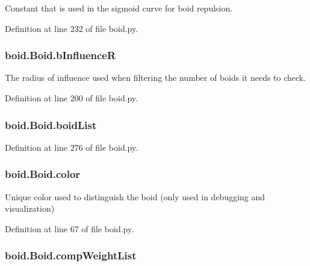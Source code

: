 Constant that is used in the sigmoid curve for boid repulsion. 



Definition at line 232 of file boid.\-py.

\hypertarget{classboid_1_1Boid_ae1a1d62fdc0e9014df5fcb1a49d37342}{
\subsubsection[{b\-Influence\-R}]{\setlength{\rightskip}{0pt plus 5cm}boid.\-Boid.\-b\-Influence\-R}}\label{classboid_1_1Boid_ae1a1d62fdc0e9014df5fcb1a49d37342}


The radius of influence used when filtering the number of boids it needs to check. 



Definition at line 200 of file boid.\-py.

\hypertarget{classboid_1_1Boid_a6d3a16e56bd3cc7efabf9ac7cae4ae16}{
\subsubsection[{boid\-List}]{\setlength{\rightskip}{0pt plus 5cm}boid.\-Boid.\-boid\-List}}\label{classboid_1_1Boid_a6d3a16e56bd3cc7efabf9ac7cae4ae16}


Definition at line 276 of file boid.\-py.

\hypertarget{classboid_1_1Boid_a6a2ca3d501e4b2b0d531d4d968487907}{
\subsubsection[{color}]{\setlength{\rightskip}{0pt plus 5cm}boid.\-Boid.\-color}}\label{classboid_1_1Boid_a6a2ca3d501e4b2b0d531d4d968487907}


Unique color used to distinguish the boid (only used in debugging and visualization) 



Definition at line 67 of file boid.\-py.

\hypertarget{classboid_1_1Boid_a811abb81b81e3b3e8e08e77a908ddb58}{
\subsubsection[{comp\-Weight\-List}]{\setlength{\rightskip}{0pt plus 5cm}boid.\-Boid.\-comp\-Weight\-List}}\label{classboid_1_1Boid_a811abb81b81e3b3e8e08e77a908ddb58}


